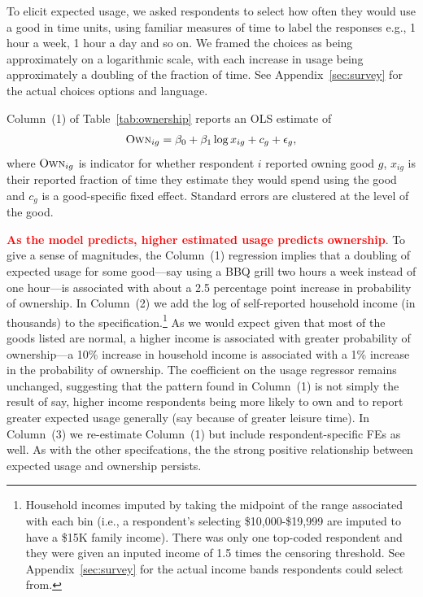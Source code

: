 \documentclass[11pt]{article}
\newcommand{\important}[1]{\textcolor{red}{\textbf{#1}}}
\newcommand{\important}[1]{#1}
\begin{document}
To elicit expected usage, we asked respondents to select how often they would use a good in time units, using familiar measures of time to label the responses e.g., 1 hour a week, 1 hour a day and so on.
We framed the choices as being approximately on a logarithmic scale, with each increase in usage being approximately a doubling of the fraction of time.
See Appendix~\ref{sec:survey} for the actual choices options and language.

Column~(1) of Table~\ref{tab:ownership} reports an OLS estimate of 
\begin{align} \label{eq:base_own}
\textsc{Own}_{ig} = \beta_0 + \beta_1 \log x_{ig} + c_{g} + \epsilon_{g}, 
\end{align}
where $\textsc{Own}_{ig}$ is indicator for whether respondent $i$ reported owning good $g$, $x_{ig}$ is their reported fraction of time they estimate they would spend using the good and $c_g$ is a good-specific fixed effect.
Standard errors are clustered at the level of the good. 



\important{As the model predicts, higher estimated usage predicts ownership}.
To give a sense of magnitudes, the Column~(1) regression implies that a doubling of expected usage for some good---say using a BBQ grill two hours a week instead of one hour---is associated with about a 2.5 percentage point increase in probability of ownership. 
In Column~(2) we add the log of self-reported household income (in thousands) to the specification.\footnote{
  Household incomes imputed by taking the midpoint of the range associated with each bin (i.e., a respondent's selecting \$10,000-\$19,999 are imputed to have a \$15K family income).
  There was only one top-coded respondent and they were given an inputed income of 1.5 times the censoring threshold.
  See Appendix~\ref{sec:survey} for the actual income bands respondents could select from.
  }
As we would expect given that most of the goods listed are normal, a higher income is associated with greater probability of ownership---a 10\% increase in household income is associated with a 1\% increase in the probability of ownership.  
The coefficient on the usage regressor remains unchanged, suggesting that the pattern found in Column~(1) is not simply the result of say, higher income respondents being more likely to own and to report greater expected usage generally (say because of greater leisure time). 
In Column~(3) we re-estimate Column~(1) but include respondent-specific FEs as well.
As with the other specifcations, the the strong positive relationship between expected usage and ownership persists. 
\end{document}
